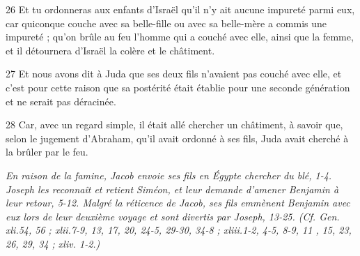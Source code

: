 \par 26 Et tu ordonneras aux enfants d'Israël qu'il n'y ait aucune impureté parmi eux, car quiconque couche avec sa belle-fille ou avec sa belle-mère a commis une impureté ; qu'on brûle au feu l'homme qui a couché avec elle, ainsi que la femme, et il détournera d'Israël la colère et le châtiment.
\par 27 Et nous avons dit à Juda que ses deux fils n'avaient pas couché avec elle, et c'est pour cette raison que sa postérité était établie pour une seconde génération et ne serait pas déracinée.
\par 28 Car, avec un regard simple, il était allé chercher un châtiment, à savoir que, selon le jugement d'Abraham, qu'il avait ordonné à ses fils, Juda avait cherché à la brûler par le feu.


\par \textit{En raison de la famine, Jacob envoie ses fils en Égypte chercher du blé, 1-4. Joseph les reconnaît et retient Siméon, et leur demande d'amener Benjamin à leur retour, 5-12. Malgré la réticence de Jacob, ses fils emmènent Benjamin avec eux lors de leur deuxième voyage et sont divertis par Joseph, 13-25. (Cf. Gen. xli.54, 56 ; xlii.7-9, 13, 17, 20, 24-5, 29-30, 34-8 ; xliii.1-2, 4-5, 8-9, 11 , 15, 23, 26, 29, 34 ; xliv. 1-2.)}

